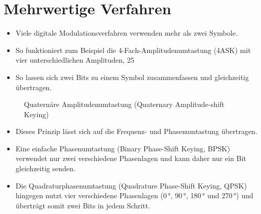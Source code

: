 
\section{Mehrwertige Verfahren}
\label{section:mehrwertige_verfahren}
\begin{frame}%
\begin{itemize}
  \item Viele digitale Modulationsverfahren verwenden mehr als zwei Symbole.
  \item So funktioniert zum Beispiel die 4-Fach-Amplitudenumtastung (4ASK) mit vier unterschiedlichen Amplituden, 25 %
  \item So lassen sich zwei Bits zu einem Symbol zusammenfassen und gleichzeitig übertragen.
  \end{itemize}

\begin{figure}
    \caption{\scriptsize Quaternäre Amplitudenumtastung (Quaternary Amplitude-shift Keying)}
    \label{4ask}
\end{figure}

\end{frame}

\begin{frame}\begin{itemize}
  \item Dieses Prinzip lässt sich auf die Frequenz- und Phasenumtastung übertragen.
  \item Eine einfache Phasenumtastung (Binary Phase-Shift Keying, BPSK) verwendet nur zwei verschiedene Phasenlagen und kann daher nur ein Bit gleichzeitig senden.
  \item Die Quadraturphasenumtastung (Quadrature Phase-Shift Keying, QPSK) hingegen nutzt vier verschiedene Phasenlagen (0 °, 90 °, 180 ° und 270 °) und überträgt somit zwei Bits in jedem Schritt.
  \end{itemize}
\end{frame}

\begin{frame}
\end{frame}

